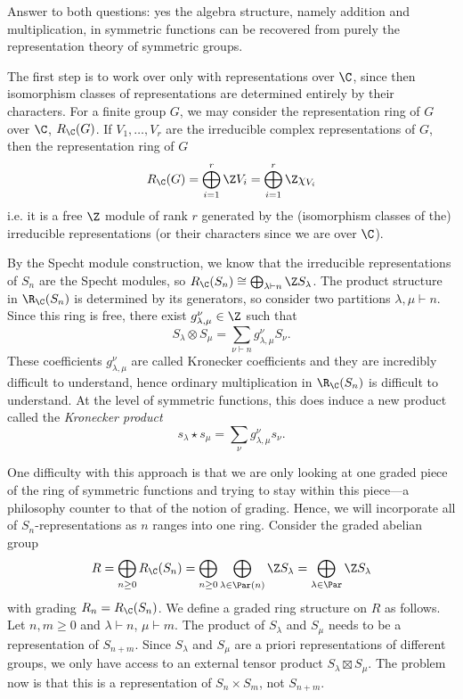 \documentclass[12pt]{article}
\begin{document}
Answer to both questions: yes the algebra structure, namely addition and multiplication, in symmetric functions can be recovered from purely the representation theory of symmetric groups.

The first step is to work over only with representations over $ \C $, since then isomorphism classes of representations are determined entirely by their characters. For a finite group $ G $, we may consider the representation ring of $ G $ over $ \C $, $ R_\C(G) $. If $  V_{1},\ldots,V_{r}  $ are the irreducible complex representations of $ G $, then the representation ring of $ G $
\[
  R_{\C}(G) = \bigoplus_{i=1}^{r}\Z V_{i} = \bigoplus_{i=1}^{r}\Z\chi_{V_{i}}
\]
i.e. it is a free $ \Z $ module of rank $ r $ generated by the (isomorphism classes of the) irreducible representations (or their characters since we are over $ \C $). 

By the Specht module construction, we know that the irreducible representations of $ S_{n} $ are the Specht modules, so $ R_{\C}(S_{n}) \cong \bigoplus_{\lambda\vdash n}\Z S_{\lambda} $. The product structure in $ \R_{\C}(S_{n}) $ is determined by its generators, so consider two partitions $ \lambda,\mu\vdash n $. Since this ring is free, there exist $ g_{\lambda,\mu}^{\nu}\in \Z $ such that
\[
  S_{\lambda}\otimes S_{\mu} = \sum_{\nu\vdash n} g_{\lambda,\mu}^{\nu} S_{\nu}.
\]
These coefficients $ g_{\lambda,\mu}^{\nu} $ are called Kronecker coefficients and they are incredibly difficult to understand, hence ordinary multiplication in $ \R_{\C}(S_{n}) $ is difficult to understand. At the level of symmetric functions, this does induce a new product called the \textit{Kronecker product}
\[
  s_{\lambda}\star s_{\mu} = \sum_{\nu} g_{\lambda,\mu}^{\nu} s_{\nu}.
\]

One difficulty with this approach is that we are only looking at one graded piece of the ring of symmetric functions and trying to stay within this piece---a philosophy counter to that of the notion of grading. Hence, we will incorporate all of $ S_{n} $-representations as $ n $ ranges into one ring. Consider the graded abelian group
\[
  R = \bigoplus_{n\geq0} R_{\C}(S_{n}) =\bigoplus_{n\geq0} \bigoplus_{\lambda\in \Par(n)} \Z S_{\lambda} = \bigoplus_{\lambda\in \Par} \Z S_{\lambda}
\]
with grading $ R_{n} = R_{\C}(S_{n}) $. We define a graded ring structure on $ R $ as follows. Let $ n,m\geq 0 $ and $\lambda\vdash n $, $ \mu\vdash m $. The product of $ S_{\lambda} $  and $ S_{\mu} $ needs to be a representation of $ S_{n+m} $. Since $ S_{\lambda} $ and $ S_{\mu} $ are a priori representations of different groups, we only have access to an external tensor product $ S_{\lambda}\boxtimes S_{\mu} $. The problem now is that this is a representation of $ S_{n}\times S_{m} $, not $ S_{n+m} $.
\end{document}
